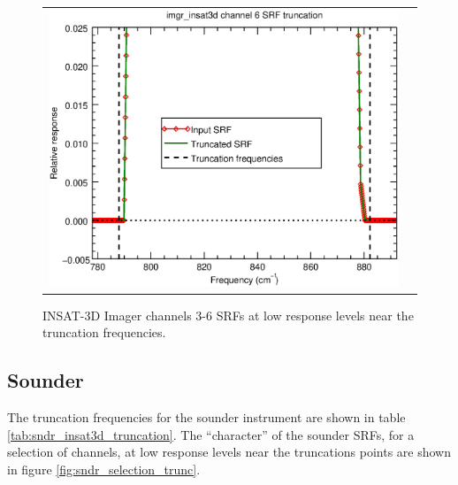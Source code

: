 \begin{figure}[H]
\begin{tabular}{c c}
    \includegraphics[scale=0.35]{graphics/imgr/trunc/imgr_insat3d-6.trunc.eps}
  \end{tabular}
  \caption{INSAT-3D Imager channels 3-6 SRFs at low response levels near the truncation frequencies.}
  \label{fig:imgr_ch3-6_trunc}
\end{figure}


\subsection{Sounder}
The truncation frequencies for the sounder instrument are shown in table \ref{tab:sndr_insat3d_truncation}. The ``character'' of the sounder SRFs, for a selection of channels, at low response levels near the truncations points are shown in figure \ref{fig:sndr_selection_trunc}. 



